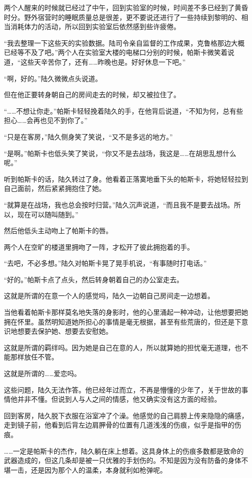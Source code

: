 两个人醒来的时候就已经过了中午，回到实验室的时候，时间差不多已经到了黄昏时分。野外宿营时的睡眠质量总是很差，更不要说还进行了一些持续到黎明的、相当消耗体力的活动，所以回到实验室后依然感到些许疲倦。

“我去整理一下这些天的实验数据。陆司令亲自监督的工作成果，克鲁格那边大概已经等不及了吧。”两个人在实验室大楼的电梯口分别的时候，帕斯卡微笑着说道，“这些天辛苦你了，还有……昨晚也是。好好休息一下吧。”

“啊，好的。”陆久微微点头说道。

但在他正要转身朝自己的房间走去的时候，却又被拉住了。

“……不想让你走。”帕斯卡轻轻挽着陆久的手，在他背后说道，“不知为何，总有些担心……会再也见不到你了。”

“只是在客房，”陆久侧身笑了笑说，“又不是多远的地方。”

“是啊。”帕斯卡也低头笑了笑说，“你又不是去战场，我这是……在胡思乱想什么呢。”

听到帕斯卡的话，陆久转过了身。他看着正落寞地垂下头的帕斯卡，将她轻轻拉到自己面前，然后紧紧拥抱住了她。

“就算是在战场，我也总会按时归营。”陆久沉声说道，“而且我不是要去战场。所以，现在可以随叫随到。”

然后他低头主动吻上了帕斯卡的唇。

两个人在空旷的楼道里拥吻了一阵，才松开了彼此拥抱着的手。

“去吧，不必多想。”陆久对帕斯卡晃了晃手机说，“有事随时打电话。”

“好的。”帕斯卡点了点头，然后转身朝着自己的办公室走去。

这就是所谓的在意一个人的感觉吗，陆久一边朝自己房间走一边想着。

当他看着帕斯卡那样莫名地失落的身影时，他的心里涌起一种冲动，让他想要把她拥在怀里。虽然明知道她所担心的事情是毫无根据，甚至有些荒唐的，但还是下意识地想要去保护她、想要去安慰她。

这就是所谓的羁绊吗。因为她是自己在意的人，所以就算她的担忧毫无道理，也不能那样放任不管。

这就是所谓的……爱恋吗。

这些问题，陆久无法作答。他已经年过而立，不再是懵懂的少年了，关于世故的事情他并非不懂。但说到人与人之间的情感，他又确实没有这方面的经验。

回到客房，陆久脱下衣服在浴室冲了个澡。他感觉的自己肩膀上传来隐隐的痛感，走到镜子前，他看到后背左边肩胛骨的位置有几道浅浅的伤痕，似乎是指甲的伤痕。

……一定是帕斯卡的杰作，陆久躺在床上想着。这具身体上的伤痕多数都是致命的武器造成的，但这几条却是被一只优雅的手划伤的。不知是因为没有防备的身体不堪一击，还是因为那个人的温柔，本身就利如枪弹呢。

